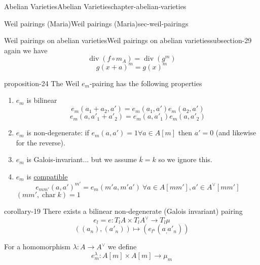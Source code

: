 \documentclass[oneside,10pt,]{book}
\numberwithin{equation}{section}
\newcommand{\lb}{[}
\newcommand{\rb}{]}
\DeclareMathOperator{\divisor}{div}
\DeclareMathOperator{\characteristic}{char}
\begin{document}
\begin{chapterptx}{Abelian Varieties}{}{Abelian Varieties}{}{}{chapter-abelian-varieties}
\begin{sectionptx}{Weil pairings (Maria)}{}{Weil pairings (Maria)}{}{}{sec-weil-pairings}
\begin{subsectionptx}{Weil pairings on abelian varieties}{}{Weil pairings on abelian varieties}{}{}{subsection-29}
\begin{equation*}
\end{equation*}
again we have%
\begin{equation*}
\divisor( f\circ m_A) = \divisor (g^m)
\end{equation*}
%
\begin{equation*}
g(x+a)^m = g(x)^m
\end{equation*}
%
\begin{proposition}{}{}{proposition-24}%
\hypertarget{p-302}{}%
The Weil \(e_m\)-pairing has the following properties\leavevmode%
\begin{enumerate}
\item\hypertarget{li-44}{}\(e_m\) is bilinear%
\begin{equation*}
e_m(a_1+a_2,a') = e_m(a_1,a')e_m(a_2, a')
\end{equation*}
%
\begin{equation*}
e_m(a,a'_1+a'_2) = e_m(a,a'_1)e_m(a,a'_2)
\end{equation*}
%
\item\hypertarget{li-45}{}\(e_m\) is non-degenerate: if \(e_m(a,a') = 1 \forall a\in A\lb m\rb\) then \(a' = 0\) (and likewise for the reverse).%
\item\hypertarget{li-46}{}\(e_m\) is Galois-invariant... but we assume \(\overline k =k\) so we ignore this.%
\item\hypertarget{li-47}{}\(e_m\) is \hyperref[def-buntes-compat]{compatible}%
\begin{equation*}
e_{mm'} (a,a')^{m'} = e_m(m'a, m'a') \ \forall a \in A[mm'], a'\in A^\vee [mm']
\end{equation*}
\((mm',\characteristic k) = 1\)%
\end{enumerate}
%
\end{proposition}
\begin{corollary}{}{}{corollary-19}%
\hypertarget{p-303}{}%
There exists a bilinear non-degenerate (Galois invariant) pairing%
\begin{equation*}
e_l = e \colon T_lA \times T_lA^\vee \to T_l\mu
\end{equation*}
%
\begin{equation*}
((a_n), (a'_n)) \mapsto (e_{l^n}(a_,a'_n))
\end{equation*}
%
\end{corollary}
\hypertarget{p-304}{}%
For a homomorphism \(\lambda \colon A \to A^\vee\) we define%
\begin{equation*}
e_m^\lambda \colon A[m]\times A [m] \to \mu_m
\end{equation*}
%
\begin{equation*}

\end{equation*}
\end{subsectionptx}
\end{sectionptx}
\end{chapterptx}
\end{document}
